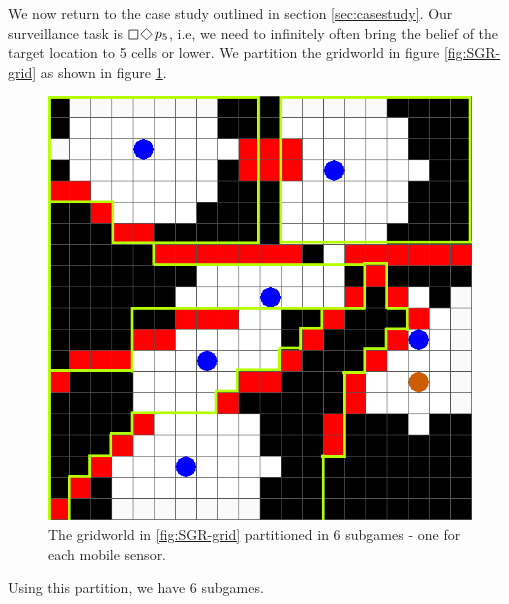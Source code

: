 We now return to the case study outlined in section \ref{sec:casestudy}. Our surveillance task is $\LTLsquare \LTLdiamond p_5$, i.e, we need to infinitely often bring the belief of the target location to 5 cells or lower. We partition the gridworld in figure \ref{fig:SGR-grid} as shown in figure \ref{fig:experiment}.

\begin{figure}
\centering
\includegraphics[scale=0.2]{figs/SGR-grid-vis-part.png}
\caption{The gridworld in \ref{fig:SGR-grid} partitioned in 6 subgames - one for each mobile sensor.}
\label{fig:experiment}
\end{figure}

Using this partition, we have 6 subgames. 